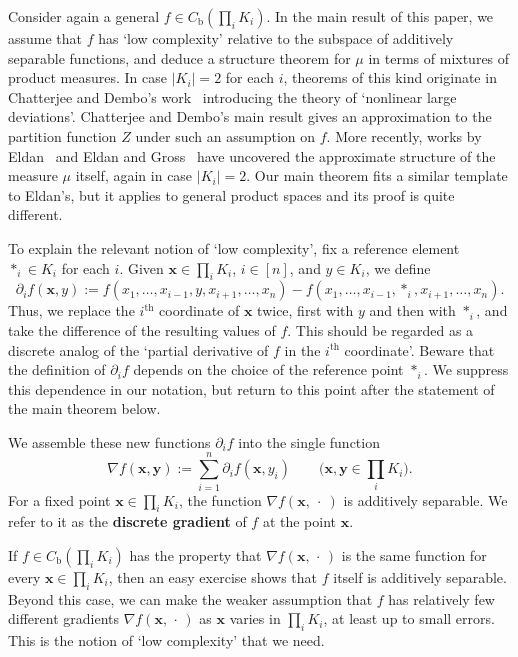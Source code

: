 \documentclass[aop,preprint]{imsart}
\theoremstyle{remark}
\renewcommand{\bf}[1]{\boldsymbol{#1}}
\renewcommand{\rm}[1]{\mathrm{#1}}
\newcommand{\rmb}{\mathrm{b}}
\begin{document}
Consider again a general $f \in C_\rm{b}(\prod_i K_i)$.  In the main result of this paper, we assume that $f$ has `low complexity' relative to the subspace of additively separable functions, and deduce a structure theorem for $\mu$ in terms of mixtures of product measures.  In case $|K_i| = 2$ for each $i$, theorems of this kind originate in Chatterjee and Dembo's work~\cite{ChaDem16} introducing the theory of `nonlinear large deviations'.  Chatterjee and Dembo's main result gives an approximation to the partition function $Z$ under such an assumption on $f$.  More recently, works by Eldan~\cite{Eld--GWcomp} and Eldan and Gross~\cite{EldGro18} have uncovered the approximate structure of the measure $\mu$ itself, again in case $|K_i|=2$.  Our main theorem fits a similar template to Eldan's, but it applies to general product spaces and its proof is quite different.

To explain the relevant notion of `low complexity', fix a reference element $\ast_i \in K_i$ for each $i$.  Given $\bf{x} \in \prod_i K_i$, $i \in [n]$, and $y \in K_i$, we define
\[\partial_i f(\bf{x},y) := f(x_1,\dots,x_{i-1},y,x_{i+1},\dots,x_n) - f(x_1,\dots,x_{i-1},\ast_i,x_{i+1},\dots,x_n).\]
Thus, we replace the $i^{\rm{th}}$ coordinate of $\bf{x}$ twice, first with $y$ and then with $\ast_i$, and take the difference of the resulting values of $f$. This should be regarded as a discrete analog of the `partial derivative of $f$ in the $i^{\rm{th}}$ coordinate'.  Beware that the definition of $\partial_i f$ depends on the choice of the reference point $\ast_i$.  We suppress this dependence in our notation, but return to this point after the statement of the main theorem below.

We assemble these new functions $\partial_i f$ into the single function
\[\nabla f(\bf{x},\bf{y}) := \sum_{i=1}^n \partial_if(\bf{x},y_i) \qquad \Big(\bf{x},\bf{y} \in \prod_i K_i\Big).\]
For a fixed point $\bf{x} \in \prod_i K_i$, the function $\nabla f(\bf{x},\ \cdot\ )$ is additively separable. We refer to it as the \textbf{discrete gradient} of $f$ at the point $\bf{x}$.

If $f\in C_\rmb(\prod_i K_i)$ has the property that $\nabla f(\bf{x},\,\cdot\,)$ is the same function for every $\bf{x} \in\prod_i K_i$, then an easy exercise shows that $f$ itself is additively separable.  Beyond this case, we can make the weaker assumption that $f$ has relatively few different gradients $\nabla f(\bf{x},\,\cdot\,)$ as $\bf{x}$ varies in $\prod_i K_i$, at least up to small errors. This is the notion of `low complexity' that we need.
\end{document}
